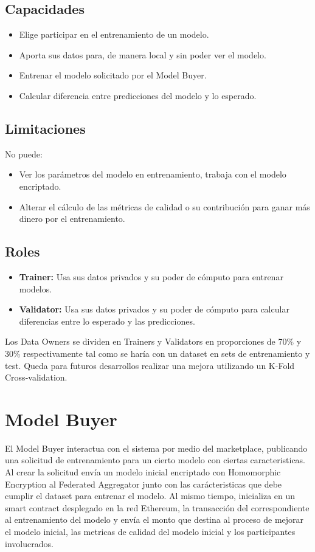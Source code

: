 \documentclass[
11pt, %
oneside, %
spanish, %
singlespacing, %
parskip, %
headsepline, %
chapterinoneline, %
]{MastersDoctoralThesis} %
\begin{document}
\subsection*{Capacidades}
\begin{itemize}
\item Elige participar en el entrenamiento de un modelo.
\item Aporta sus datos para, de manera local y sin poder ver el modelo.
\item Entrenar el modelo solicitado por el Model Buyer.
\item Calcular diferencia entre predicciones del modelo y lo esperado.
\end{itemize}

\subsection*{Limitaciones}
No puede:
\begin{itemize}
\item Ver los parámetros del modelo en entrenamiento, trabaja con el modelo encriptado.
\item Alterar el cálculo de las métricas de calidad o su contribución para ganar más dinero por el entrenamiento. 
\end{itemize}

\subsection*{Roles}
\begin{itemize}
\item \textbf{Trainer:} Usa sus datos privados y su poder de cómputo para entrenar modelos.
\item \textbf{Validator:} Usa sus datos privados y su poder de cómputo para  calcular diferencias entre lo esperado y las predicciones.
\end{itemize}

Los Data Owners se dividen en Trainers y Validators en proporciones de 70\% y 30\% respectivamente tal como se haría con un dataset en sets de entrenamiento y test. Queda para futuros desarrollos realizar una mejora utilizando un K-Fold Cross-validation.


\section{Model Buyer}
\justify
El Model Buyer interactua con el sistema por medio del marketplace, publicando una solicitud de entrenamiento para un cierto modelo con ciertas caracteristicas.
Al crear la solicitud envía un modelo inicial encriptado con Homomorphic Encryption al Federated Aggregator junto con  las carácteristicas que debe cumplir el dataset para entrenar el modelo. 
Al mismo tiempo, inicializa en un smart contract desplegado en la red Ethereum, la transacción del correspondiente al entrenamiento del modelo y envía el monto que destina al proceso de mejorar el modelo inicial, las metricas de calidad del modelo inicial y los participantes involucrados.
\end{document}
